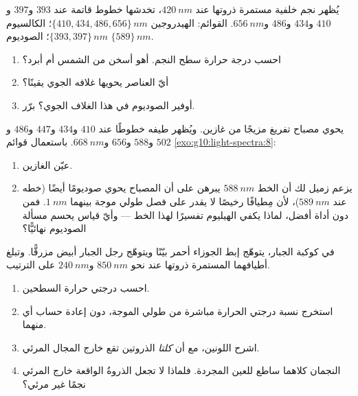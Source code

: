 \begin{exercise}[$\star\star\star$]\label{exo:g10:light-spectra:13}
يُظهر  نجم خلفية مستمرة ذروتها عند
$\qty{420}{nm}$، تخدشها خطوط قاتمة عند $393$ و$397$ و$410$ و$434$
و$486$ و$\qty{656}{nm}$. القوائم: الهيدروجين
$\{410, 434, 486, 656\}\,\unit{nm}$؛ الكالسيوم $\{393, 397\}\,\unit{nm}$؛
الصوديوم $\{589\}\,\unit{nm}$.
\begin{enumerate}
  \item احسب درجة حرارة سطح النجم. أهو أسخن من الشمس أم
        أبرد؟
  \item أيّ العناصر يحويها غلافه الجوي يقينًا؟
  \item أوفير الصوديوم في هذا الغلاف الجوي؟ برّر.
\end{enumerate}
\end{exercise}

\begin{exercise}[$\star\star\star$]\label{exo:g10:light-spectra:14}
يحوي مصباح تفريغ مزيجًا من غازين. ويُظهر طيفه
خطوطًا عند $410$ و$434$ و$447$ و$486$ و$502$ و$588$ و$656$
و$\qty{668}{nm}$. باستعمال قوائم \cref{exo:g10:light-spectra:8}:
\begin{enumerate}
  \item عيّن الغازين.
  \item يزعم زميل لك أن الخط $\qty{588}{nm}$ يبرهن على أن المصباح
        يحوي صوديومًا أيضًا (خطه عند $\qty{589}{nm}$)، لأن
        مِطيافًا رخيصًا لا يقدر على فصل طولي موجة بينهما $\qty{1}{nm}$.
        فمن دون أداة أفضل، لماذا يكفي الهيليوم
        تفسيرًا لهذا الخط --- وأيّ قياس يحسم
        مسألة الصوديوم نهائيًّا؟
\end{enumerate}
\end{exercise}

\begin{exercise}[$\star\star\star$]\label{exo:g10:light-spectra:15}
في كوكبة الجبار، يتوهّج إبط الجوزاء أحمر بيّنًا ويتوهّج رجل الجبار
أبيض مزرقًّا. وتبلغ أطيافهما المستمرة ذروتها عند نحو $\qty{850}{nm}$
و$\qty{240}{nm}$ على الترتيب.
\begin{enumerate}
  \item احسب درجتي حرارة السطحين.
  \item استخرج نسبة درجتي الحرارة مباشرة من طولي
        الموجة، دون إعادة حساب أي منهما.
  \item اشرح اللونين، مع أن \emph{كلتا} الذروتين تقع
        خارج المجال المرئي.
  \item النجمان كلاهما ساطع للعين المجردة. فلماذا لا تجعل الذروةُ
        الواقعة خارج المرئي نجمًا غير مرئي؟
\end{enumerate}
\end{exercise}

